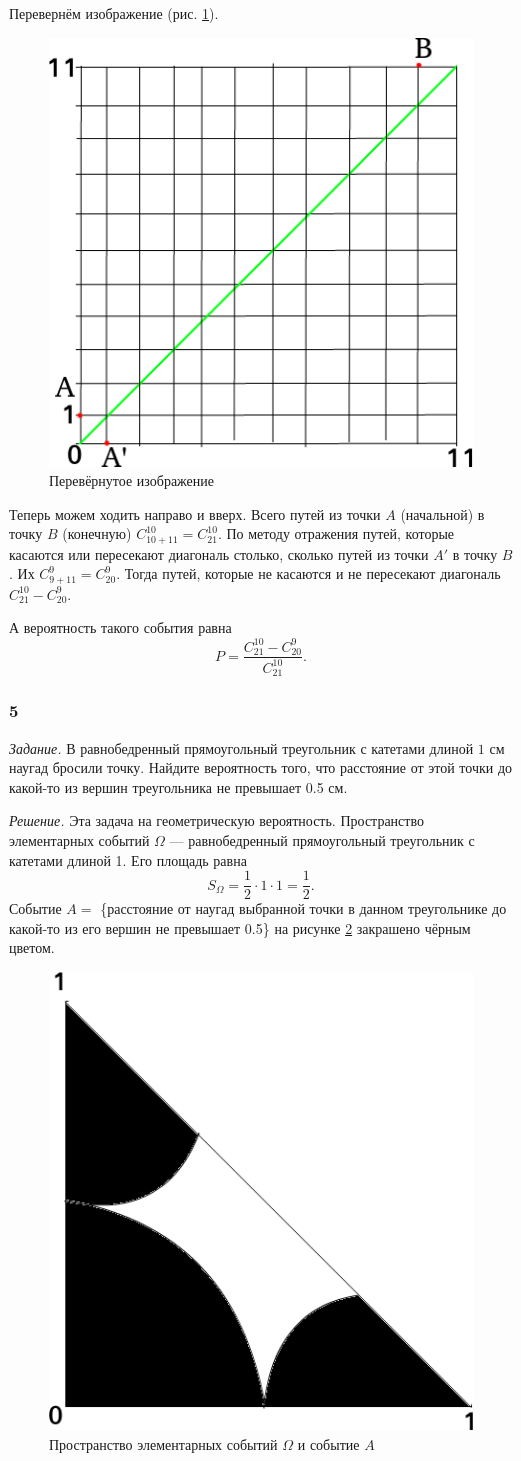 Перевернём изображение (рис. \ref{fig:41}).

\begin{figure}[h!]
  \centering
  \includegraphics[width=.4\textwidth]{./pictures/t1v1_41.png}
  \caption{Перевёрнутое изображение}
  \label{fig:41}
\end{figure}

Теперь можем ходить направо и вверх.
Всего путей из точки $A$ (начальной) в точку $B$ (конечную) $C_{10+11}^{10} = C_{21}^{10}$.
По методу отражения путей, которые касаются или пересекают диагональ столько, сколько путей из точки $A'$ в точку $B$.
Их $C_{9+11}^9 = C_{20}^9$.
Тогда путей, которые не касаются и не пересекают диагональ $C_{21}^{10} - C_{20}^9$.

А вероятность такого события равна
$$P =
\frac{C_{21}^{10} - C_{20}^9}{C_{21}^{10}}.$$

\subsubsection*{5}

\textit{Задание.} В равнобедренный прямоугольный треугольник с катетами длиной $1$ см наугад бросили точку.
Найдите вероятность того, что расстояние от этой точки до какой-то из вершин треугольника не превышает 0.5 см.

\textit{Решение.} Эта задача на геометрическую вероятность.
Пространство элементарных событий $ \Omega $ --- равнобедренный прямоугольный треугольник с катетами длиной 1.
Его площадь равна
$$S_{ \Omega } =
\frac{1}{2} \cdot 1 \cdot 1 =
\frac{1}{2}.$$
Событие $A =$ \{расстояние от наугад выбранной точки в данном треугольнике до какой-то из его вершин не превышает 0.5\} на рисунке \ref{fig:5} закрашено чёрным цветом.

\begin{figure}[h!]
  \centering
  \includegraphics[width=.4\textwidth]{./pictures/t1v1_5.png}
  \caption{Пространство элементарных событий $ \Omega $ и событие $A$}
  \label{fig:5}
\end{figure}

